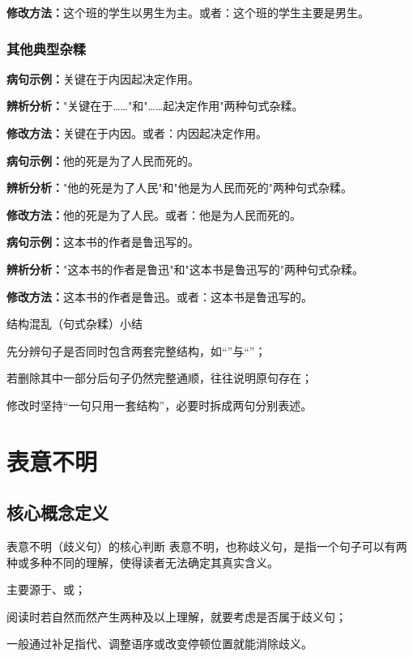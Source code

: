 \documentclass[a4paper,12pt]{ctexrep}
\newcommand{\exampleicon}{\textcolor{highlight}{\faExclamationTriangle}}
\newcommand{\analysisicon}{\textcolor{accent}{\faSearch}}
\newcommand{\revisionicon}{\textcolor{secondary}{\faCheckCircle}}
\begin{document}
\revisionicon \textbf{修改方法：}这个班的学生以男生为主。或者：这个班的学生主要是男生。

\subsection{其他典型杂糅}
\exampleicon \textbf{病句示例：}关键在于内因起决定作用。

\analysisicon \textbf{辨析分析：}"关键在于……"和"……起决定作用"两种句式杂糅。

\revisionicon \textbf{修改方法：}关键在于内因。或者：内因起决定作用。

\exampleicon \textbf{病句示例：}他的死是为了人民而死的。

\analysisicon \textbf{辨析分析：}"他的死是为了人民"和"他是为人民而死的"两种句式杂糅。

\revisionicon \textbf{修改方法：}他的死是为了人民。或者：他是为人民而死的。

\exampleicon \textbf{病句示例：}这本书的作者是鲁迅写的。

\analysisicon \textbf{辨析分析：}"这本书的作者是鲁迅"和"这本书是鲁迅写的"两种句式杂糅。

\revisionicon \textbf{修改方法：}这本书的作者是鲁迅。或者：这本书是鲁迅写的。

\begin{summarybox}{结构混乱（句式杂糅）小结}
\begin{focuspoints}
  \item 先分辨句子是否同时包含两套完整结构，如“”与“”；
  \item 若删除其中一部分后句子仍然完整通顺，往往说明原句存在；
  \item 修改时坚持“一句只用一套结构”，必要时拆成两句分别表述。
\end{focuspoints}
\end{summarybox}

\chapter{表意不明}
\section{核心概念定义}
\begin{conceptbox}{表意不明（歧义句）的核心判断}
表意不明，也称歧义句，是指一个句子可以有两种或多种不同的理解，使得读者无法确定其真实含义。
\begin{focuspoints}
  \item 主要源于、或；
  \item 阅读时若自然而然产生两种及以上理解，就要考虑是否属于歧义句；
  \item 一般通过补足指代、调整语序或改变停顿位置就能消除歧义。
\end{focuspoints}
\end{conceptbox}
\end{document}
